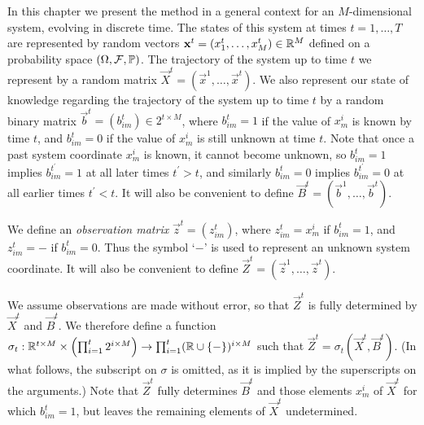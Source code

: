 In this chapter we present the method in a general context for an $M$-dimensional system, evolving in discrete time. The states of this system at times $t = 1, \dots, T$ are represented by random vectors $\mathbf{x}^t = (x^t_1, \dots, x^t_M) \in \mathbb R^M$ defined on a probability space $(\Omega, \mathcal{F}, \mathbb{P})$. The trajectory of the system up to time $t$ we represent by a random matrix $\vec{X}^t = (\vec{x}^1, \ldots, \vec{x}^t)$. We also represent our state of knowledge regarding the trajectory of the system up to time $t$ by a random binary matrix $\vec{b}^t = (b^t_{im}) \in 2^{t \times M}$, where $b^t_{im} = 1$ if the value of $x^i_m$ is known by time $t$, and $b^t_{im} = 0$ if the value of $x^i_m$ is still unknown at time $t$. Note that once a past system coordinate $x^i_m$ is known, it cannot become unknown, so $b^t_{im} = 1$ implies $b^{t^\prime}_{im} = 1$ at all later times $t^{\prime} > t$, and similarly $b^t_{im} = 0$ implies $b^{t^{\prime}}_{im} = 0$ at all earlier times $t^{\prime} < t$. It will also be convenient to define $\vec{B}^t = (\vec{b}^1,\ldots,\vec{b}^t)$.

We define an {\em observation matrix} $\vec{z}^t = (z^t_{im})$, where $z^t_{im} = x^i_m$ if $b^t_{im} = 1$, and $z^t_{im} = -$ if $b^t_{im} = 0$. Thus the symbol `$-$' is used to represent an unknown system coordinate. It will also be convenient to define $\vec{Z}^t = (\vec{z}^1,\ldots,\vec{z}^t)$. 

We assume observations are made without error, so that $\vec{Z}^t$ is fully determined by $\vec{X}^t$ and $\vec{B}^t$. We therefore define a function $\sigma_t: \mathbb R^{t \times M} \times \left( \prod_{i=1}^t 2^{i \times M} \right) \rightarrow \prod_{i=1}^t (\mathbb R \cup \{ - \})^{i \times M}$ such that $\vec{Z}^t = \sigma_t(\vec{X}^t, \vec{B}^t)$. (In what follows, the subscript on $\sigma$ is omitted, as it is implied by the superscripts on the arguments.) Note that $\vec{Z}^t$ fully determines $\vec{B}^t$ and those elements $x_m^i$ of $\vec{X}^t$ for which $b_{im}^t = 1$, but leaves the remaining elements of $\vec{X}^t$ undetermined.

